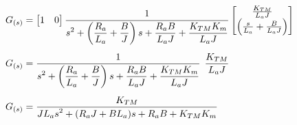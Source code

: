 \documentclass[../main.tex]{subfiles}
\begin{document}
\begin{equation}
\begin{split}
                        G_{(s)} &= \begin{bmatrix} 1 & 0 \end{bmatrix} \frac{\displaystyle 1}{\displaystyle s^2 + \left( \frac{R_a}{L_a} + \frac{B}{J} \right)s + \frac{R_a B}{L_a J} + \frac{K_{TM} K_m}{L_a J}} \begin{bmatrix} \frac{K_{TM}}{L_a J} \\ \left( \frac{s}{L_a} + \frac{B}{L_a J} \right) \end{bmatrix}\\[5pt]
                        G_{(s)} &= \frac{\displaystyle 1}{\displaystyle s^2 + \left( \frac{R_a}{L_a} + \frac{B}{J} \right)s + \frac{R_a B}{L_a J} + \frac{K_{TM} K_m}{L_a J}} \hspace{1.5mm} \frac{K_{TM}}{L_a J} \\[5pt]
                        G_{(s)} &= \frac{\displaystyle K_{TM}}{\displaystyle J L_a s^2 + (R_a J + B L_a)s + R_aB + K_{TM}K_m }
                    \end{split}
                \end{equation}
\end{document}
